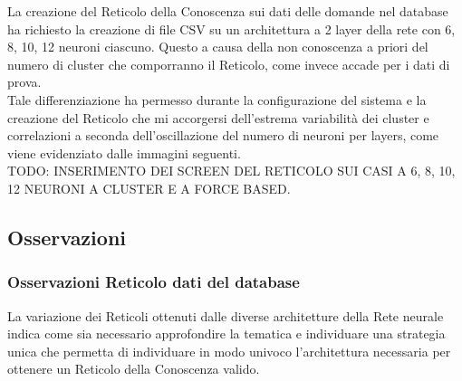 La creazione del Reticolo della Conoscenza sui dati delle domande nel database ha richiesto la creazione di file CSV su un architettura a 2 layer della rete con 6, 8, 10, 12 neuroni ciascuno. Questo a causa della non conoscenza a priori del numero di cluster che comporranno il Reticolo, come invece accade per i dati di prova.\\
Tale differenziazione ha permesso durante la configurazione del sistema e la creazione del Reticolo che mi accorgersi dell'estrema variabilit\`a dei cluster e correlazioni a seconda dell'oscillazione del numero di neuroni per layers, come viene evidenziato dalle immagini seguenti.\\

TODO: INSERIMENTO DEI SCREEN DEL RETICOLO SUI CASI A 6, 8, 10, 12 NEURONI A CLUSTER E A FORCE BASED.

\subsection{Osservazioni}
\subsubsection{Osservazioni Reticolo dati del database}
La variazione dei Reticoli ottenuti dalle diverse architetture della Rete neurale indica come sia necessario approfondire la tematica e individuare una strategia unica che permetta di individuare in modo univoco l'architettura necessaria per ottenere un Reticolo della Conoscenza valido.



